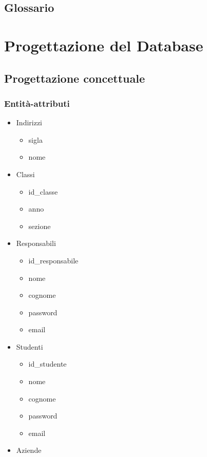 \documentclass{article}
\begin{document}
\subsection{Glossario}

\section{Progettazione del Database}
\subsection{Progettazione concettuale}
\subsubsection{Entità-attributi}
\begin{itemize}
    \item Indirizzi
    \begin{itemize}
        \item sigla
        \item nome
    \end{itemize}
    \item Classi
    \begin{itemize}
        \item id\_classe
        \item anno
        \item sezione
    \end{itemize}
    \item Responsabili
    \begin{itemize}
        \item id\_responsabile
        \item nome
        \item cognome
        \item password
        \item email
    \end{itemize}
    \item Studenti
    \begin{itemize}
        \item id\_studente
        \item nome
        \item cognome
        \item password
        \item email
    \end{itemize}
    \item Aziende
    \begin{itemize}

\end{itemize}
\end{itemize}
\end{document}
